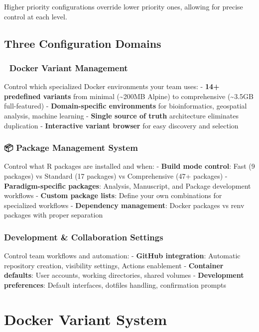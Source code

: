 \documentclass[
]{article}
\begin{document}
Higher priority configurations override lower priority ones, allowing
for precise control at each level.

\subsection{Three Configuration
Domains}\label{three-configuration-domains}

\subsubsection{🐳 Docker Variant
Management}\label{docker-variant-management}

Control which specialized Docker environments your team uses: -
\textbf{14+ predefined variants} from minimal (\textasciitilde200MB
Alpine) to comprehensive (\textasciitilde3.5GB full-featured) -
\textbf{Domain-specific environments} for bioinformatics, geospatial
analysis, machine learning - \textbf{Single source of truth}
architecture eliminates duplication - \textbf{Interactive variant
browser} for easy discovery and selection

\subsubsection{📦 Package Management
System}\label{package-management-system}

Control what R packages are installed and when: - \textbf{Build mode
control}: Fast (9 packages) vs Standard (17 packages) vs Comprehensive
(47+ packages) - \textbf{Paradigm-specific packages}: Analysis,
Manuscript, and Package development workflows - \textbf{Custom package
lists}: Define your own combinations for specialized workflows -
\textbf{Dependency management}: Docker packages vs renv packages with
proper separation

\subsubsection{Development \& Collaboration
Settings}\label{development-collaboration-settings}

Control team workflows and automation: - \textbf{GitHub integration}:
Automatic repository creation, visibility settings, Actions enablement -
\textbf{Container defaults}: User accounts, working directories, shared
volumes - \textbf{Development preferences}: Default interfaces, dotfiles
handling, confirmation prompts

\section{Docker Variant System}\label{docker-variant-system}
\end{document}
